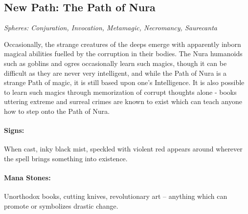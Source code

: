 \begin{multicols}{2}

\subsection{New Path: The Path of Nura}

\textit{Spheres: Conjuration, Invocation, Metamagic, Necromancy, Saurecanta}

\noindent Occasionally, the strange creatures of the deeps emerge with apparently inborn magical abilities fuelled by the corruption in their bodies.  The Nura humanoids such as goblins and ogres occasionally learn such magics, though it can be difficult as they are never very intelligent, and while the Path of Nura is a strange Path of magic, it is still based upon one's Intelligence.  It is also possible to learn such magics through memorization of corrupt thoughts alone - books uttering extreme and surreal crimes are known to exist which can teach anyone how to step onto the Path of Nura.

\paragraph{Signs:} When cast, inky black mist, speckled with violent red appears around wherever the spell brings something into existence.

\paragraph{Mana Stones:} Unorthodox books, cutting knives, revolutionary art -- anything which can promote or symbolizes drastic change.

\end{multicols}


